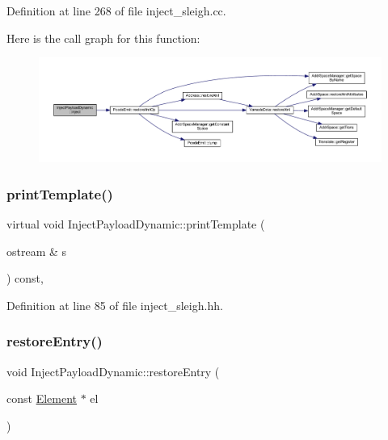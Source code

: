 Definition at line 268 of file inject\+\_\+sleigh.\+cc.

Here is the call graph for this function\+:
\nopagebreak
\begin{figure}[H]
\begin{center}
\leavevmode
\includegraphics[width=350pt]{class_inject_payload_dynamic_a3016f641e5901ad165b08969ac33730f_cgraph}
\end{center}
\end{figure}
\mbox{\label{class_inject_payload_dynamic_a683f6cc0b43395ad3644743f95292d59}} 
\subsubsection{\texorpdfstring{printTemplate()}{printTemplate()}}
{\footnotesize\ttfamily virtual void Inject\+Payload\+Dynamic\+::print\+Template (\begin{DoxyParamCaption}\item[{ostream \&}]{s }\end{DoxyParamCaption}) const\hspace{0.3cm}{\ttfamily [inline]}, {\ttfamily [virtual]}}



Definition at line 85 of file inject\+\_\+sleigh.\+hh.

\mbox{\label{class_inject_payload_dynamic_a0cce9f9b5053cacbd52f4635a687bae2}} 
\subsubsection{\texorpdfstring{restoreEntry()}{restoreEntry()}}
{\footnotesize\ttfamily void Inject\+Payload\+Dynamic\+::restore\+Entry (\begin{DoxyParamCaption}\item[{const \mbox{\hyperlink{class_element}{Element}} $\ast$}]{el }\end{DoxyParamCaption})}



